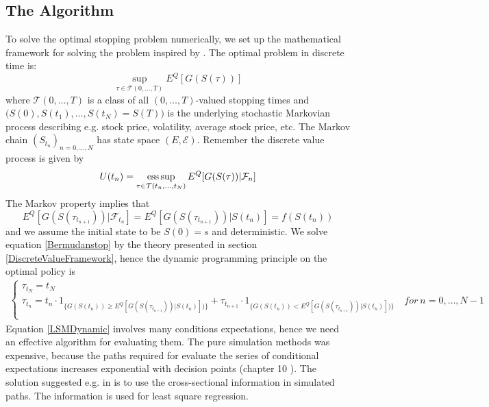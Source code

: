 \subsection{The Algorithm}
To solve the optimal stopping problem numerically, we set up the mathematical framework for solving the problem inspired by \parencite{analysisLSM}. The optimal problem in discrete time is:
\begin{equation}\label{Bermudanstop}
\sup_{\tau \in \mathcal{T}(0,\ldots,T)} E^Q[G(S(\tau))]
\end{equation}
where $\mathcal{T}(0,\ldots,T)$ is a class of all $(0,\ldots,T)$-valued stopping times and $\bigg(S(0),S(t_1), \ldots, S(t_N)=S(T)\bigg)$ is the underlying stochastic Markovian process describing e.g. stock price, volatility, average stock price, etc. The Markov chain $(S_{t_n})_{n=0,\ldots,N}$ has state space $(E, \mathcal{E})$. Remember the discrete value process is given by
$$U(t_n)=\operatorname*{ess\,sup}_{\tau \in \mathcal{T}(t_n,\ldots,t_N)} E^Q[G(S(\tau))|\mathcal{F}_n]$$
The Markov property implies that 
$$E^Q[G(S(\tau_{t_{n+1}}))|\mathcal{F}_{t_n}]=E^Q[G(S(\tau_{t_{n+1}}))|S(t_n)]=f(S(t_n))$$ 
and we assume the initial state to be $S(0)=s$ and deterministic. We solve equation \eqref{Bermudanstop} by the theory presented in section \ref{DiscreteValueFramework}, hence the dynamic programming principle on the optimal policy is
\begin{equation}\label{LSMDynamic}
\begin{split}
\begin{cases}
          \tau_{t_N} = t_N\\
          \tau_{t_n} = t_n \cdot 1_{\{G(S(t_n)) \geq E^Q[G(S(\tau_{t_{n+1}}))|S(t_n)])\}} + \tau_{t_{n+1}} \cdot 1_{\{G(S(t_n)) < E^Q[G(S(\tau_{t_{n+1}}))|S(t_n)])\}} \quad for \ n={0,\ldots,N-1} \\ 
\end{cases}
\end{split}
\end{equation}
Equation \eqref{LSMDynamic} involves many conditions expectations, hence we need an effective algorithm for evaluating them. The pure simulation methods was expensive, because the paths required for evaluate the series of conditional expectations increases exponential with decision points (chapter 10 \parencite{OVERHAUSMARCUS2007EHD}). The solution suggested e.g. in \parencite{LSM,Tsitsiklis} is to use the cross-sectional information in simulated paths. The information is used for least square regression. \\

